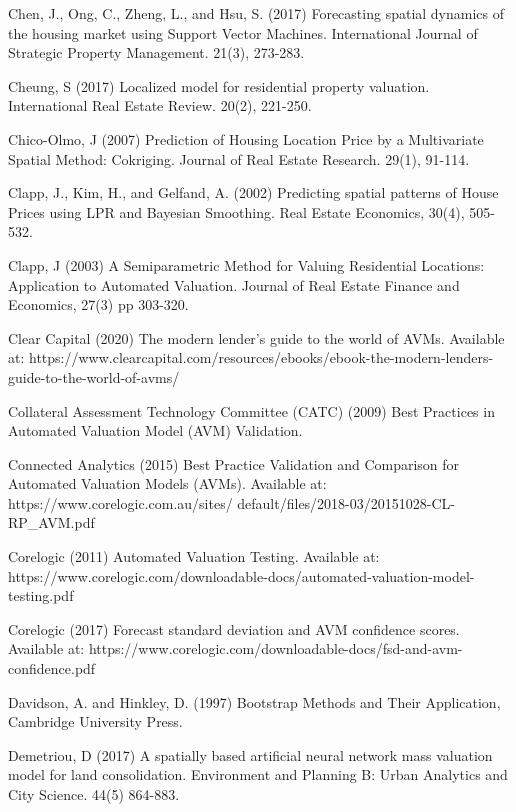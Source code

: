 \documentclass[colTwo]{anon}
\theoremstyle{definition}
\begin{document}
\begin{thebibliography}{50}
\harvarditem{}{}{}Chen, J., Ong, C., Zheng, L., and Hsu, S. (2017) Forecasting spatial dynamics of the housing market using Support Vector Machines. International Journal of Strategic Property Management. 21(3), 273-283. 

\harvarditem{}{}{}Cheung, S (2017) Localized model for residential property valuation. International Real Estate Review. 20(2), 221-250. 

\harvarditem{}{}{}Chico-Olmo, J (2007) Prediction of Housing Location Price by a Multivariate Spatial Method: Cokriging. Journal of Real Estate Research. 29(1), 91-114. 

\harvarditem{}{}{}Clapp, J., Kim, H., and Gelfand, A. (2002) Predicting spatial patterns of House Prices using LPR and Bayesian Smoothing. Real Estate Economics, 30(4), 505-532. 

\harvarditem{}{}{}Clapp, J (2003) A Semiparametric Method for Valuing Residential Locations: Application to Automated Valuation. Journal of Real Estate Finance and Economics, 27(3) pp 303-320. 

\harvarditem{}{}{}Clear Capital (2020) The modern lender’s guide to the world of AVMs. Available at: https://www.clearcapital.com/resources/ebooks/ebook-the-modern-lenders-guide-to-the-world-of-avms/

\harvarditem{}{}{}Collateral Assessment Technology Committee (CATC) (2009) Best Practices in Automated Valuation Model (AVM) Validation. 

\harvarditem{}{}{}Connected Analytics (2015) Best Practice Validation and Comparison for Automated Valuation Models (AVMs). Available at: https://www.corelogic.com.au/sites/ default/files/2018-03/20151028-CL-RP\_AVM.pdf

\harvarditem{}{}{}Corelogic (2011) Automated Valuation Testing. Available at: https://www.corelogic.com/downloadable-docs/automated-valuation-model-testing.pdf
		
\harvarditem{}{}{}Corelogic (2017) Forecast standard deviation and AVM confidence scores. Available at: https://www.corelogic.com/downloadable-docs/fsd-and-avm-confidence.pdf

\harvarditem{}{}{}Davidson, A. and Hinkley, D. (1997) Bootstrap Methods and Their Application, Cambridge University Press.  

\harvarditem{}{}{}Demetriou, D (2017) A spatially based artificial neural network mass valuation model for land consolidation. Environment and Planning B: Urban Analytics and City Science. 44(5) 864-883. 


\end{thebibliography}
\end{document}
